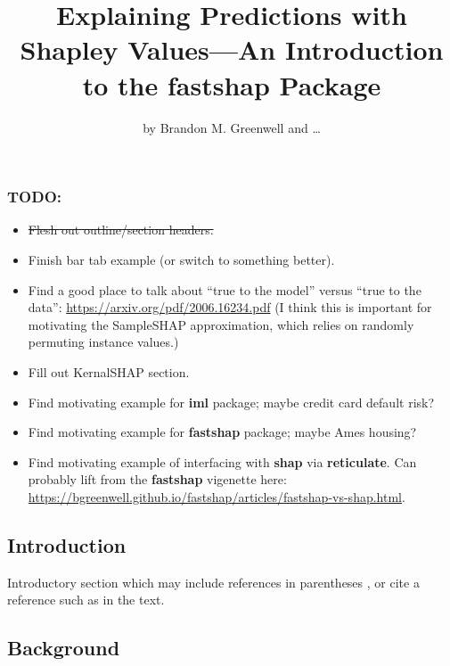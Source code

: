 \title{Explaining Predictions with Shapley Values---An Introduction to
the fastshap Package}
\author{by Brandon M. Greenwell and \ldots{}}

\maketitle


\hypertarget{todo}{%
\subsubsection{TODO:}\label{todo}}

\begin{itemize}
\tightlist
\item
  \sout{Flesh out outline/section headers.}
\item
  Finish bar tab example (or switch to something better).
\item
  Find a good place to talk about ``true to the model'' versus ``true to
  the data'': \url{https://arxiv.org/pdf/2006.16234.pdf} (I think this
  is important for motivating the SampleSHAP approximation, which relies
  on randomly permuting instance values.)
\item
  Fill out KernalSHAP section.
\item
  Find motivating example for \textbf{iml} package; maybe credit card
  default risk?
\item
  Find motivating example for \textbf{fastshap} package; maybe Ames
  housing?
\item
  Find motivating example of interfacing with \textbf{shap} via
  \textbf{reticulate}. Can probably lift from the \textbf{fastshap}
  vigenette here:
  \url{https://bgreenwell.github.io/fastshap/articles/fastshap-vs-shap.html}.
\end{itemize}

\hypertarget{introduction}{%
\subsection{Introduction}\label{introduction}}

Introductory section which may include references in parentheses
\citep{R}, or cite a reference such as \citet{R} in the text.

\hypertarget{background}{%
\subsection{Background}\label{background}}

